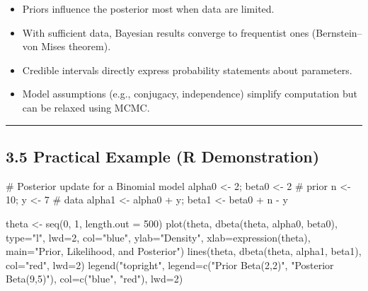 \documentclass[
  letterpaper,
  DIV=11,
  numbers=noendperiod]{scrreprt}
\newenvironment{Shaded}{\begin{snugshade}}{\end{snugshade}}
\newcommand{\AttributeTok}[1]{\textcolor[rgb]{0.40,0.45,0.13}{#1}}
\newcommand{\CommentTok}[1]{\textcolor[rgb]{0.37,0.37,0.37}{#1}}
\newcommand{\DecValTok}[1]{\textcolor[rgb]{0.68,0.00,0.00}{#1}}
\newcommand{\FunctionTok}[1]{\textcolor[rgb]{0.28,0.35,0.67}{#1}}
\newcommand{\NormalTok}[1]{\textcolor[rgb]{0.00,0.23,0.31}{#1}}
\newcommand{\OtherTok}[1]{\textcolor[rgb]{0.00,0.23,0.31}{#1}}
\newcommand{\SpecialCharTok}[1]{\textcolor[rgb]{0.37,0.37,0.37}{#1}}
\newcommand{\StringTok}[1]{\textcolor[rgb]{0.13,0.47,0.30}{#1}}
\providecommand{\tightlist}{%
  \setlength{\itemsep}{0pt}\setlength{\parskip}{0pt}}
\begin{document}
\begin{itemize}
\tightlist
\item
  Priors influence the posterior most when data are limited.\\
\item
  With sufficient data, Bayesian results converge to frequentist ones
  (Bernstein--von Mises theorem).\\
\item
  Credible intervals directly express probability statements about
  parameters.\\
\item
  Model assumptions (e.g., conjugacy, independence) simplify computation
  but can be relaxed using MCMC.
\end{itemize}

\begin{center}\rule{0.5\linewidth}{0.5pt}\end{center}

\subsection{3.5 Practical Example (R
Demonstration)}\label{practical-example-r-demonstration}

\begin{Shaded}
\begin{Highlighting}[]
\CommentTok{\# Posterior update for a Binomial model}
\NormalTok{alpha0 }\OtherTok{\textless{}{-}} \DecValTok{2}\NormalTok{; beta0 }\OtherTok{\textless{}{-}} \DecValTok{2}  \CommentTok{\# prior}
\NormalTok{n }\OtherTok{\textless{}{-}} \DecValTok{10}\NormalTok{; y }\OtherTok{\textless{}{-}} \DecValTok{7}          \CommentTok{\# data}
\NormalTok{alpha1 }\OtherTok{\textless{}{-}}\NormalTok{ alpha0 }\SpecialCharTok{+}\NormalTok{ y; beta1 }\OtherTok{\textless{}{-}}\NormalTok{ beta0 }\SpecialCharTok{+}\NormalTok{ n }\SpecialCharTok{{-}}\NormalTok{ y}

\NormalTok{theta }\OtherTok{\textless{}{-}} \FunctionTok{seq}\NormalTok{(}\DecValTok{0}\NormalTok{, }\DecValTok{1}\NormalTok{, }\AttributeTok{length.out =} \DecValTok{500}\NormalTok{)}
\FunctionTok{plot}\NormalTok{(theta, }\FunctionTok{dbeta}\NormalTok{(theta, alpha0, beta0), }\AttributeTok{type=}\StringTok{"l"}\NormalTok{, }\AttributeTok{lwd=}\DecValTok{2}\NormalTok{, }\AttributeTok{col=}\StringTok{"blue"}\NormalTok{,}
     \AttributeTok{ylab=}\StringTok{"Density"}\NormalTok{, }\AttributeTok{xlab=}\FunctionTok{expression}\NormalTok{(theta),}
     \AttributeTok{main=}\StringTok{"Prior, Likelihood, and Posterior"}\NormalTok{)}
\FunctionTok{lines}\NormalTok{(theta, }\FunctionTok{dbeta}\NormalTok{(theta, alpha1, beta1), }\AttributeTok{col=}\StringTok{"red"}\NormalTok{, }\AttributeTok{lwd=}\DecValTok{2}\NormalTok{)}
\FunctionTok{legend}\NormalTok{(}\StringTok{"topright"}\NormalTok{,}
       \AttributeTok{legend=}\FunctionTok{c}\NormalTok{(}\StringTok{"Prior Beta(2,2)"}\NormalTok{, }\StringTok{"Posterior Beta(9,5)"}\NormalTok{),}
       \AttributeTok{col=}\FunctionTok{c}\NormalTok{(}\StringTok{"blue"}\NormalTok{, }\StringTok{"red"}\NormalTok{), }\AttributeTok{lwd=}\DecValTok{2}\NormalTok{)}
\end{Highlighting}
\end{Shaded}
\end{document}
